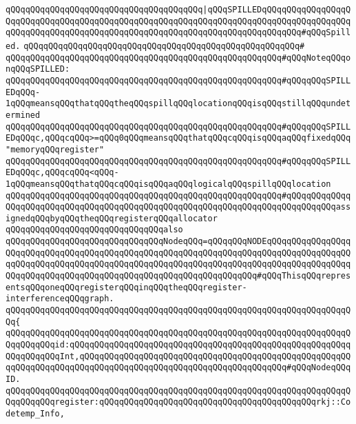 \verb|qQQqqQQqqQQqqQQqqQQqqQQqqQQqqQQqqQQqqQQq|\verb#|qQQqSPILLEDqQQqqQQqqQQqqQQqqQQqqQQqqQQqqQQqqQQqqQQqqQQqqQQqqQQqqQQqqQQqqQQqqQQqqQQqqQQqqQQqqQQqqQQqqQQqqQQqqQQqqQQqqQQqqQQqqQQqqQQqqQQqqQQqqQQqqQQqqQQqqQQqqQQq#\verb|#qQQqSpilled.|\newline
\verb|qQQqqQQqqQQqqQQqqQQqqQQqqQQqqQQqqQQqqQQqqQQqqQQqqQQqqQQq#|\newline
\verb|qQQqqQQqqQQqqQQqqQQqqQQqqQQqqQQqqQQqqQQqqQQqqQQqqQQqqQQq#qQQqNoteqQQqonqQQqSPILLED:|\newline
\verb|qQQqqQQqqQQqqQQqqQQqqQQqqQQqqQQqqQQqqQQqqQQqqQQqqQQqqQQq#qQQqqQQqSPILLEDqQQq-1qQQqmeansqQQqthatqQQqtheqQQqspillqQQqlocationqQQqisqQQqstillqQQqundetermined|\newline
\verb|qQQqqQQqqQQqqQQqqQQqqQQqqQQqqQQqqQQqqQQqqQQqqQQqqQQqqQQq#qQQqqQQqSPILLEDqQQqc,qQQqcqQQq>=qQQq0qQQqmeansqQQqthatqQQqcqQQqisqQQqaqQQqfixedqQQq"memoryqQQqregister"|\newline
\verb|qQQqqQQqqQQqqQQqqQQqqQQqqQQqqQQqqQQqqQQqqQQqqQQqqQQqqQQq#qQQqqQQqSPILLEDqQQqc,qQQqcqQQq<qQQq-1qQQqmeansqQQqthatqQQqcqQQqisqQQqaqQQqlogicalqQQqspillqQQqlocation|\newline
\verb|qQQqqQQqqQQqqQQqqQQqqQQqqQQqqQQqqQQqqQQqqQQqqQQqqQQqqQQq#qQQqqQQqqQQqqQQqqQQqqQQqqQQqqQQqqQQqqQQqqQQqqQQqqQQqqQQqqQQqqQQqqQQqqQQqqQQqqQQqassignedqQQqbyqQQqtheqQQqregisterqQQqallocator|\newline
\newline
\newline
\verb|qQQqqQQqqQQqqQQqqQQqqQQqqQQqqQQqalso|\newline
\verb|qQQqqQQqqQQqqQQqqQQqqQQqqQQqqQQqNodeqQQq=qQQqqQQqNODEqQQqqQQqqQQqqQQqqQQqqQQqqQQqqQQqqQQqqQQqqQQqqQQqqQQqqQQqqQQqqQQqqQQqqQQqqQQqqQQqqQQqqQQqqQQqqQQqqQQqqQQqqQQqqQQqqQQqqQQqqQQqqQQqqQQqqQQqqQQqqQQqqQQqqQQqqQQqqQQqqQQqqQQqqQQqqQQqqQQqqQQqqQQqqQQqqQQqqQQqqQQqqQQq#qQQqThisqQQqrepresentsqQQqoneqQQqregisterqQQqinqQQqtheqQQqregister-interferenceqQQqgraph.|\newline
\verb|qQQqqQQqqQQqqQQqqQQqqQQqqQQqqQQqqQQqqQQqqQQqqQQqqQQqqQQqqQQqqQQqqQQqqQQq{|\newline
\verb|qQQqqQQqqQQqqQQqqQQqqQQqqQQqqQQqqQQqqQQqqQQqqQQqqQQqqQQqqQQqqQQqqQQqqQQqqQQqqQQqid:qQQqqQQqqQQqqQQqqQQqqQQqqQQqqQQqqQQqqQQqqQQqqQQqqQQqqQQqqQQqqQQqqQQqInt,qQQqqQQqqQQqqQQqqQQqqQQqqQQqqQQqqQQqqQQqqQQqqQQqqQQqqQQqqQQqqQQqqQQqqQQqqQQqqQQqqQQqqQQqqQQqqQQqqQQqqQQqqQQqqQQq#qQQqNodeqQQqID.|\newline
\verb|qQQqqQQqqQQqqQQqqQQqqQQqqQQqqQQqqQQqqQQqqQQqqQQqqQQqqQQqqQQqqQQqqQQqqQQqqQQqqQQqregister:qQQqqQQqqQQqqQQqqQQqqQQqqQQqqQQqqQQqqQQqqQQqrkj::Codetemp_Info,|\newline
